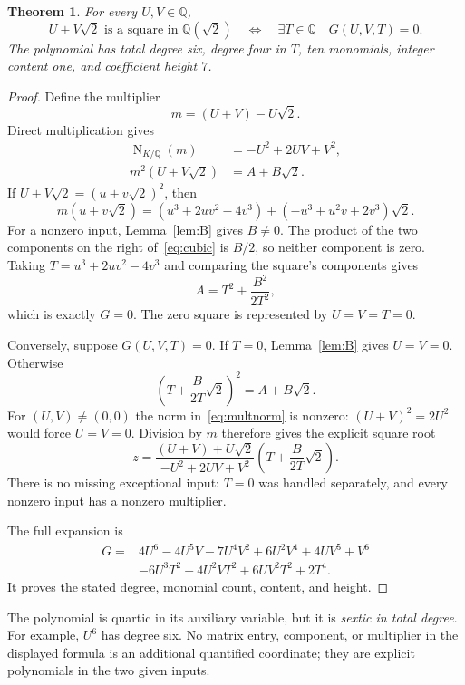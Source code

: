 \documentclass[11pt,a4paper]{article}
\newtheorem{theorem}{Theorem}[section]
\newcommand{\Q}{\mathbb Q}\newcommand{\Z}{\mathbb Z}
\DeclareMathOperator{\Norm}{N}
\begin{document}
\begin{theorem}\label{thm:explicit}
For every $U,V\in\Q$,
\[
 U+V\sqrt2\text{ is a square in }\Q(\sqrt2)
 \quad\Longleftrightarrow\quad
 \exists T\in\Q\quad G(U,V,T)=0.
\]
The polynomial has total degree six, degree four in $T$, ten monomials,
integer content one, and coefficient height $7$.
\end{theorem}
\begin{proof}
Define the multiplier
\[
             m=(U+V)-U\sqrt2.
\]
Direct multiplication gives
\begin{align}
 \Norm_{K/\Q}(m)&=-U^2+2UV+V^2,\label{eq:multnorm}\\
 m^2(U+V\sqrt2)&=A+B\sqrt2.\label{eq:multsquare}
\end{align}
If $U+V\sqrt2=(u+v\sqrt2)^2$, then
\begin{equation}\label{eq:cubic}
 m(u+v\sqrt2)=(u^3+2uv^2-4v^3)+(-u^3+u^2v+2v^3)\sqrt2.
\end{equation}
For a nonzero input, Lemma~\ref{lem:B} gives $B\ne0$.
The product of the two components on the right of~\eqref{eq:cubic}
is $B/2$, so neither component is zero. Taking
$T=u^3+2uv^2-4v^3$ and comparing the square's components gives
\[
               A=T^2+\frac{B^2}{2T^2},
\]
which is exactly $G=0$. The zero square is represented by $U=V=T=0$.

Conversely, suppose $G(U,V,T)=0$. If $T=0$, Lemma~\ref{lem:B}
gives $U=V=0$. Otherwise
\[
 \left(T+\frac{B}{2T}\sqrt2\right)^2=A+B\sqrt2.
\]
For $(U,V)\ne(0,0)$ the norm in~\eqref{eq:multnorm} is nonzero:
$(U+V)^2=2U^2$ would force $U=V=0$.
Division by $m$ therefore gives
the explicit square root
\begin{equation}\label{eq:recover}
 z=\frac{(U+V)+U\sqrt2}{-U^2+2UV+V^2}
                         \left(T+\frac{B}{2T}\sqrt2\right).
\end{equation}
There is no missing exceptional input: $T=0$ was handled separately,
and every nonzero input has a nonzero multiplier.

The full expansion is
\begin{align*}
 G={}&4U^6-4U^5V-7U^4V^2+6U^2V^4+4UV^5+V^6\\
    &-6U^3T^2+4U^2VT^2+6UV^2T^2+2T^4.
\end{align*}
It proves the stated degree, monomial count, content, and height.
\end{proof}

The polynomial is quartic in its auxiliary variable, but it is
\emph{sextic in total degree}. For example, $U^6$ has degree six.
No matrix entry, component, or multiplier in the displayed formula
is an additional quantified coordinate; they are explicit polynomials
in the two given inputs.
\end{document}

